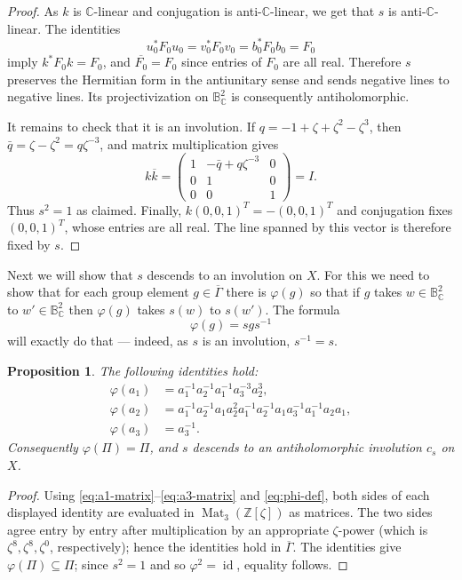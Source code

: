 \documentclass[11pt]{amsart}
\newtheorem{proposition}[theorem]{Proposition}
\theoremstyle{definition}
\theoremstyle{remark}
\newcommand{\Z}{\mathbb Z}
\newcommand{\C}{\mathbb C}
\newcommand{\B}{\mathbb B^2_{\C}}
\newcommand{\GammaMax}{\overline\Gamma}
\newcommand{\PiCS}{\Pi}
\newcommand{\id}{\operatorname{id}}
\newcommand{\phiA}{\varphi}
\begin{document}
\begin{proof}
As $k$ is $\mathbb C$-linear and conjugation is anti-$\mathbb
C$-linear, we get that $s$ is anti-$\mathbb C$-linear.  The identities
\[
 u_0^*F_0u_0=v_0^*F_0v_0=b_0^*F_0b_0=F_0
\]
imply $k^*F_0k=F_0$, and ${\overline {F_0}}=F_0$ since entries of
$F_0$ are all real.  Therefore $s$ preserves the Hermitian form in the
antiunitary sense and sends negative lines to negative lines.  Its
projectivization on $\B$ is consequently antiholomorphic.

It remains to check that it is an involution.  If
$q=-1+\zeta+\zeta^2-\zeta^3$, then
$\bar q=\zeta-\zeta^2=q\zeta^{-3}$, and matrix multiplication gives
\[
 k{\overline {k}}=
 \begin{pmatrix}
 1&-\bar q+q\zeta^{-3}&0\\0&1&0\\0&0&1
 \end{pmatrix}=I.
\]
Thus $s^2=1$ as claimed.  Finally,
$k(0,0,1)^T=-(0,0,1)^T$ and conjugation fixes $(0,0,1)^T$, whose entries are all
real.  The line spanned by this vector is therefore
fixed by $s$.
\end{proof}
Next we will show that $s$ descends to an involution on $X$. For this
we need to show that for each group element $g\in \GammaMax$ there is
$\phiA (g)$ so that if $g$ takes $w\in \B$ to  $w'\in \B$ then
$\phiA (g)$ takes $s(w)$ to $s(w')$. The formula 
\begin{equation}\label{eq:phi-def}
 \phiA(g)=sgs^{-1}
\end{equation}
will exactly do that --- indeed, as $s$ is an involution, $s^{-1}=s$.

\begin{proposition}\label{prop:phi-words}
The following identities hold:
\begin{align}
 \phiA(a_1)&=a_1^{-1}a_2^{-1}a_1^{-1}a_3^{-3}a_2^3,
 \label{eq:phi-a1}\\
 \phiA(a_2)&=a_1^{-1}a_2^{-1}a_1a_2^2
 a_1^{-1}a_2^{-1}a_1a_3^{-1}a_1^{-1}a_2a_1,
 \label{eq:phi-a2}\\
 \phiA(a_3)&=a_3^{-1}.
 \label{eq:phi-a3}
\end{align}
Consequently $\phiA(\PiCS)=\PiCS$, and $s$ descends to an
antiholomorphic involution $c_s$ on $X$.
\end{proposition}

\begin{proof}
Using \eqref{eq:a1-matrix}--\eqref{eq:a3-matrix} and
\eqref{eq:phi-def}, both sides of each displayed identity are
evaluated in $\operatorname{Mat}_3(\Z[\zeta ])$ as matrices. The two
sides agree entry by entry after multiplication by an appropriate
$\zeta$-power (which is $\zeta ^8, \zeta ^8, \zeta ^0$, respectively);
hence the identities hold in $\GammaMax$.  The identities give
$\phiA(\PiCS)\subseteq\PiCS$; since $s^2=1$ and so $\phiA^2=\id$,
equality follows.
\end{proof}
\end{document}
